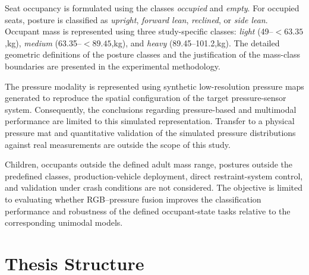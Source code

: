 Seat occupancy is formulated using the classes \textit{occupied} and \textit{empty}. For occupied seats, posture is classified 
as \textit{upright}, \textit{forward lean}, \textit{reclined}, or \textit{side lean}. Occupant mass is represented using three 
study-specific classes: \textit{light} (49--$<63.35$,kg), \textit{medium} (63.35--$<89.45$,kg), and \textit{heavy} (89.45--101.2,kg). 
The detailed geometric definitions of the posture classes and the justification of the mass-class boundaries are presented in 
the experimental methodology.

The pressure modality is represented using synthetic low-resolution pressure maps generated to reproduce the spatial 
configuration of the target pressure-sensor system. Consequently, the conclusions regarding pressure-based and multimodal 
performance are limited to this simulated representation. Transfer to a physical pressure mat and quantitative validation 
of the simulated pressure distributions against real measurements are outside the scope of this study.

Children, occupants outside the defined adult mass range, postures outside the predefined classes, production-vehicle deployment, 
direct restraint-system control, and validation under crash conditions are not considered. The objective is limited to 
evaluating whether RGB--pressure fusion improves the classification performance and robustness of the defined occupant-state 
tasks relative to the corresponding unimodal models.








































\section{Thesis Structure}
\label{sec:thesis-structure}

